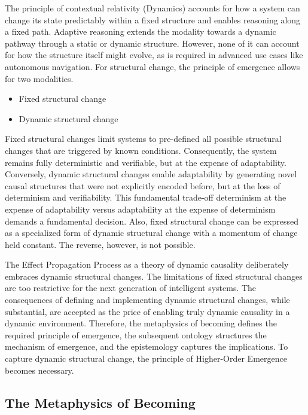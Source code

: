 The principle of contextual relativity (Dynamics) accounts for how a system can change its state predictably within a fixed structure and enables reasoning along a fixed path. Adaptive reasoning extends the  modality towards a dynamic pathway through a static or dynamic structure. However, none of it can account for how the structure itself might evolve, as is required in advanced use cases like autonomous navigation. For structural change, the principle of emergence allows for two modalities.

\begin{itemize}
	\item Fixed structural change
	\item Dynamic structural change
\end{itemize}

Fixed structural changes limit systems to pre-defined all possible structural changes that are triggered by known conditions.
Consequently, the system remains fully deterministic and verifiable, but at the expense of adaptability. 
Conversely, dynamic structural changes enable adaptability by  generating novel causal structures that were not explicitly encoded before,
but at the loss of determinism and verifiability. This fundamental trade-off determinism at the expense of adaptability versus
adaptability at the expense of  determinism demands a fundamental decision. Also, fixed structural change can be expressed 
as a specialized form of dynamic structural change with a momentum of change held constant. The reverse, however, is not possible. 

The Effect Propagation Process as a theory of dynamic causality deliberately embraces dynamic structural changes.
The limitations of fixed structural changes are too restrictive for the next generation of intelligent systems.
The consequences of defining and implementing dynamic structural changes, while substantial, 
are accepted as the price of enabling truly dynamic causality in a dynamic environment. 
Therefore, the metaphysics of becoming defines the required principle of emergence, 
the subsequent ontology structures the mechanism of emergence, and the epistemology captures 
the implications. To capture dynamic structural change, the principle of Higher-Order Emergence  becomes necessary.

\subsection{The Metaphysics of Becoming} 
\label{sec:metaphysics_becoming}

